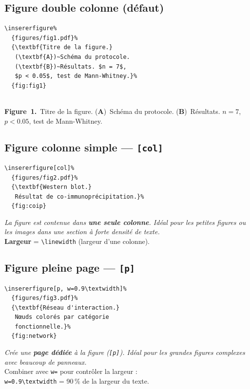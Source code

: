 \documentclass[12pt, a4paper]{article}
\newcommand{\simfigbox}[2][fig.pdf]{%
  \begin{center}
    \fbox{\parbox{0.78\linewidth}{\centering\vspace{8pt}%
      \textcolor{gray!60}{\rule{2.2cm}{1.4cm}}\\[4pt]
      {\tiny\ttfamily\color{gray} #1}\vspace{8pt}}}\\[4pt]
    {\small\textcolor{ENSorange}{\textbf{Figure~1.}}\ #2}%
  \end{center}}
\begin{document}
\subsection{Figure double colonne (défaut)}

\begin{demo}
\begin{lstlisting}[style=latexcode]
% Occupe les deux colonnes
\insererfigure%
  {figures/fig1.pdf}%
  {\textbf{Titre de la figure.}
   (\textbf{A})~Schéma du protocole.
   (\textbf{B})~Résultats. $n = 7$,
   $p < 0.05$, test de Mann-Whitney.}%
  {fig:fig1}
\end{lstlisting}
\tcblower
\simfigbox[figures/fig1.pdf]{Titre de la figure. (\textbf{A})~Schéma du protocole. (\textbf{B})~Résultats. $n = 7$, $p < 0.05$, test de Mann-Whitney.}
\end{demo}

\subsection{Figure colonne simple — \texttt{[col]}}

\begin{demo}
\begin{lstlisting}[style=latexcode]
\insererfigure[col]%
  {figures/fig2.pdf}%
  {\textbf{Western blot.}
   Résultat de co-immunoprécipitation.}%
  {fig:coip}
\end{lstlisting}
\tcblower
{\footnotesize\itshape La figure est contenue dans \textbf{une seule colonne}. Idéal pour les petites figures ou les images dans une section à forte densité de texte.}\\[8pt]
{\footnotesize\textbf{Largeur} = \texttt{\textbackslash linewidth} (largeur d'une colonne).}
\end{demo}

\subsection{Figure pleine page — \texttt{[p]}}

\begin{demo}
\begin{lstlisting}[style=latexcode]
\insererfigure[p, w=0.9\textwidth]%
  {figures/fig3.pdf}%
  {\textbf{Réseau d'interaction.}
   Nœuds colorés par catégorie
   fonctionnelle.}%
  {fig:network}
\end{lstlisting}
\tcblower
{\footnotesize\itshape Crée une \textbf{page dédiée} à la figure (\texttt{[p]}). Idéal pour les grandes figures complexes avec beaucoup de panneaux.}\\[8pt]
{\footnotesize Combiner avec \texttt{w=} pour contrôler la largeur :\\
\texttt{w=0.9\textbackslash textwidth} = 90\,\% de la largeur du texte.}
\end{demo}
\end{document}
